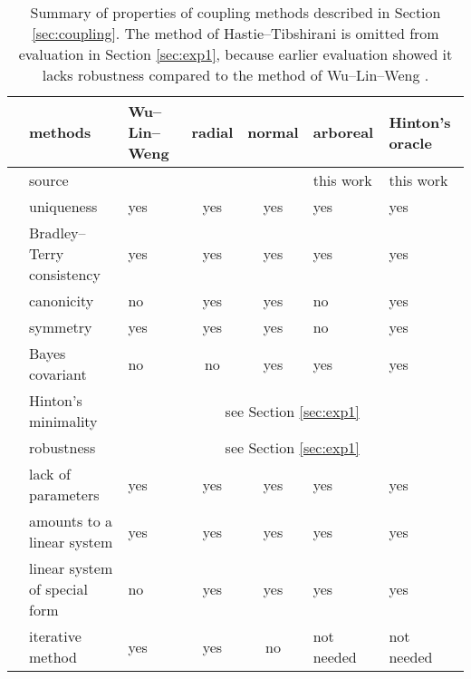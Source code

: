 \begin{table}[!ht]
	\begin{tabular}{cm{2.5cm}|m{1.5cm}ccm{1.5cm}|m{1.5cm}}
		\hline 
		&methods %
			& Wu--Lin--Weng & radial & normal & arboreal & Hinton's oracle \\
		\hline 
		&source %
			& \cite{wu2004probability} & \cite{vsuch2015new} & \cite{vsuch2016bayes} & this work & this work \\
		\multirow{5}{*}{\begin{turn}{90}\makecell{exact}\end{turn}}
		&uniqueness %
			& yes & yes & yes & yes & yes \\
		&Bradley--Terry consistency %
			& yes & yes & yes & yes & yes \\
		&canonicity %
			& no & yes & yes & no & yes \\
		&symmetry %
			& yes & yes & yes & no & yes \\
		& Bayes covariant %
			& no & no & yes & yes & yes \\
		\hline
		\multirow{5}{*}{\begin{turn}{90}\makecell{non-exact}\end{turn}}
		&Hinton's minimality %
			& \multicolumn{5}{c}{see Section \ref{sec:exp1}} \\
		&robustness %
			& \multicolumn{5}{c}{see Section \ref{sec:exp1}} \\
		&lack of parameters %
			& yes & yes & yes & yes & yes \\
		& amounts to a linear system %
			& yes & yes & yes & yes & yes\\
		& linear system of special form %
			& no & yes & yes & yes & yes \\
		& iterative method %
			& yes & yes & no & not needed & not needed\\
		\hline
	\end{tabular}
	\caption{Summary of properties of coupling methods described in Section \ref{sec:coupling}. The method of Hastie--Tibshirani is omitted from evaluation in Section \ref{sec:exp1}, because earlier evaluation showed it lacks robustness compared to the method of Wu--Lin--Weng \cite{wu2004probability}.}
	\label{tab:summaryCoupling}
\end{table}


